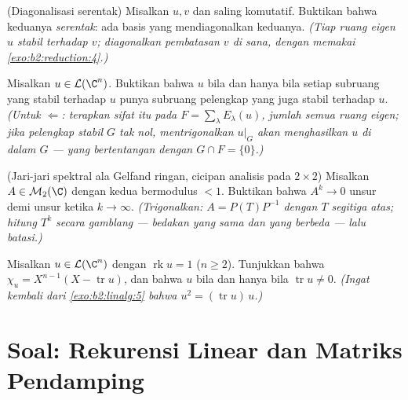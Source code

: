\begin{exercise}[$\star\star\star$]\label{exo:b2:reduction:9}
(Diagonalisasi serentak) Misalkan $u, v$  dan
saling komutatif. Buktikan bahwa keduanya 
\emph{serentak}: ada basis yang mendiagonalkan keduanya. \emph{(Tiap ruang
eigen $u$ stabil terhadap $v$; diagonalkan pembatasan $v$ di sana,
dengan memakai \cref{exo:b2:reduction:4}.)}
\end{exercise}

\begin{exercise}[$\star\star\star$]\label{exo:b2:reduction:10}
Misalkan $u \in \mathcal{L}(\C^n)$. Buktikan bahwa $u$  bila dan hanya bila setiap subruang yang stabil terhadap
$u$ punya subruang pelengkap yang juga stabil terhadap $u$. \emph{(Untuk
$\Leftarrow$: terapkan sifat itu pada $F = \sum_\lambda E_\lambda(u)$,
jumlah semua ruang eigen; jika pelengkap stabil $G$ tak nol, mentrigonalkan
$u|_G$ akan menghasilkan  $u$ di dalam $G$ --- yang
bertentangan dengan $G \cap F = \{0\}$.)}
\end{exercise}

\begin{exercise}[$\star\star\star$]\label{exo:b2:reduction:11}
(Jari-jari spektral ala Gelfand ringan, cicipan analisis pada
$2\times2$) Misalkan $A \in \mathcal{M}_2(\C)$ dengan kedua  bermodulus $< 1$. Buktikan bahwa $A^k \to 0$ unsur demi unsur
ketika $k \to \infty$. \emph{(Trigonalkan: $A = P(T)P^{-1}$ dengan $T$
segitiga atas; hitung $T^k$ secara gamblang --- bedakan  yang
sama dan yang berbeda --- lalu batasi.)}
\end{exercise}

\begin{exercise}[$\star\star$]\label{exo:b2:reduction:12}
Misalkan $u \in \mathcal{L}(\C^n)$ dengan $\operatorname{rk} u = 1$ ($n
\geq 2$). Tunjukkan bahwa $\chi_u = X^{n-1}(X - \operatorname{tr} u)$,
dan bahwa $u$  bila dan hanya bila $\operatorname{tr} u
\neq 0$. \emph{(Ingat kembali dari \cref{exo:b2:linalg:5} bahwa $u^2 =
(\operatorname{tr} u)\,u$.)}
\end{exercise}

\section{Soal: Rekurensi Linear dan Matriks Pendamping}


